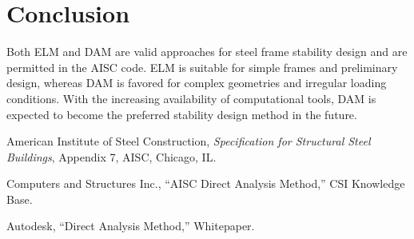 \documentclass[12pt,a4paper]{article}
\begin{document}
\section{Conclusion}
Both ELM and DAM are valid approaches for steel frame stability design and are permitted in the AISC code. ELM is suitable for simple frames and preliminary design, whereas DAM is favored for complex geometries and irregular loading conditions. With the increasing availability of computational tools, DAM is expected to become the preferred stability design method in the future.


\begin{thebibliography}{9}

American Institute of Steel Construction, 
\textit{Specification for Structural Steel Buildings}, Appendix 7, AISC, Chicago, IL.

Computers and Structures Inc., 
``AISC Direct Analysis Method,'' CSI Knowledge Base. 

Autodesk, 
``Direct Analysis Method,'' Whitepaper.
\end{thebibliography}
\end{document}
